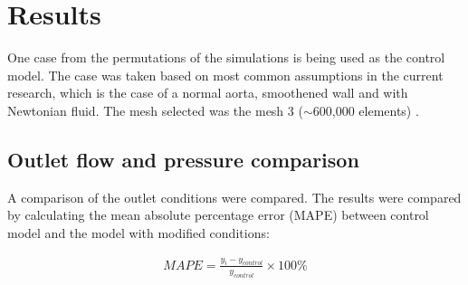 \chapter{Results}
\label{chapterlabel6}

One case from the permutations of the simulations is being used as the control model. The case was taken based on most common assumptions in the current research, which is the case of a normal aorta, smoothened wall and with Newtonian fluid. The mesh selected was the mesh 3 ($\sim$600,000 elements) \cite{Steinman2012AssumptionsHemodynamics}.

\section{Outlet flow and pressure comparison}
A comparison of the outlet conditions were compared. The results were compared by calculating the mean absolute percentage error (MAPE) between control model and the model with modified conditions:

\begin{align}
    MAPE = \frac{y_{i}-y_{control}}{y_{control}} \times 100 \%
\end{align}

